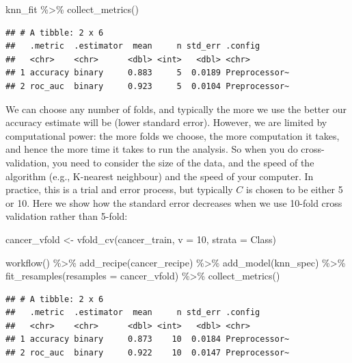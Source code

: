 \documentclass[
]{krantz}
\makeatletter
\newenvironment{Shaded}{\begin{snugshade}}{\end{snugshade}}
\newcommand{\AttributeTok}[1]{\textcolor[rgb]{0.61,0.61,0.61}{#1}}
\newcommand{\DecValTok}[1]{\textcolor[rgb]{0.06,0.06,0.06}{#1}}
\newcommand{\FunctionTok}[1]{\textcolor[rgb]{0,0,0}{#1}}
\newcommand{\NormalTok}[1]{#1}
\newcommand{\OtherTok}[1]{\textcolor[rgb]{0.37,0.37,0.37}{#1}}
\newcommand{\SpecialCharTok}[1]{\textcolor[rgb]{0,0,0}{#1}}
\newenvironment{kframe}{%
\medskip{}
\setlength{\fboxsep}{.8em}
 \def\at@end@of@kframe{}%
 \ifinner\ifhmode%
  \def\at@end@of@kframe{\end{minipage}}%
  \begin{minipage}{\columnwidth}%
 \fi\fi%
 \def\FrameCommand##1{\hskip\@totalleftmargin \hskip-\fboxsep
 \colorbox{shadecolor}{##1}\hskip-\fboxsep
     \hskip-\linewidth \hskip-\@totalleftmargin \hskip\columnwidth}%
 \MakeFramed {\advance\hsize-\width
   \@totalleftmargin\z@ \linewidth\hsize
   \@setminipage}}%
 {\par\unskip\endMakeFramed%
 \at@end@of@kframe}
\renewenvironment{Shaded}{\begin{kframe}}{\end{kframe}}
\makeatother
\begin{document}
\begin{Shaded}
\begin{Highlighting}[]
\NormalTok{knn\_fit }\SpecialCharTok{\%\textgreater{}\%} \FunctionTok{collect\_metrics}\NormalTok{()}
\end{Highlighting}
\end{Shaded}

\begin{verbatim}
## # A tibble: 2 x 6
##   .metric  .estimator  mean     n std_err .config      
##   <chr>    <chr>      <dbl> <int>   <dbl> <chr>        
## 1 accuracy binary     0.883     5  0.0189 Preprocessor~
## 2 roc_auc  binary     0.923     5  0.0104 Preprocessor~
\end{verbatim}

We can choose any number of folds, and typically the more we use the better our
accuracy estimate will be (lower standard error). However, we are limited
by computational power: the
more folds we choose, the more computation it takes, and hence the more time
it takes to run the analysis. So when you do cross-validation, you need to
consider the size of the data, and the speed of the algorithm (e.g., K-nearest
neighbour) and the speed of your computer. In practice, this is a trial and
error process, but typically \(C\) is chosen to be either 5 or 10. Here we show
how the standard error decreases when we use 10-fold cross validation rather
than 5-fold:

\begin{Shaded}
\begin{Highlighting}[]
\NormalTok{cancer\_vfold }\OtherTok{\textless{}{-}} \FunctionTok{vfold\_cv}\NormalTok{(cancer\_train, }\AttributeTok{v =} \DecValTok{10}\NormalTok{, }\AttributeTok{strata =}\NormalTok{ Class)}

\FunctionTok{workflow}\NormalTok{() }\SpecialCharTok{\%\textgreater{}\%}
  \FunctionTok{add\_recipe}\NormalTok{(cancer\_recipe) }\SpecialCharTok{\%\textgreater{}\%}
  \FunctionTok{add\_model}\NormalTok{(knn\_spec) }\SpecialCharTok{\%\textgreater{}\%}
  \FunctionTok{fit\_resamples}\NormalTok{(}\AttributeTok{resamples =}\NormalTok{ cancer\_vfold) }\SpecialCharTok{\%\textgreater{}\%}
  \FunctionTok{collect\_metrics}\NormalTok{()}
\end{Highlighting}
\end{Shaded}

\begin{verbatim}
## # A tibble: 2 x 6
##   .metric  .estimator  mean     n std_err .config      
##   <chr>    <chr>      <dbl> <int>   <dbl> <chr>        
## 1 accuracy binary     0.873    10  0.0184 Preprocessor~
## 2 roc_auc  binary     0.922    10  0.0147 Preprocessor~
\end{verbatim}
\end{document}
